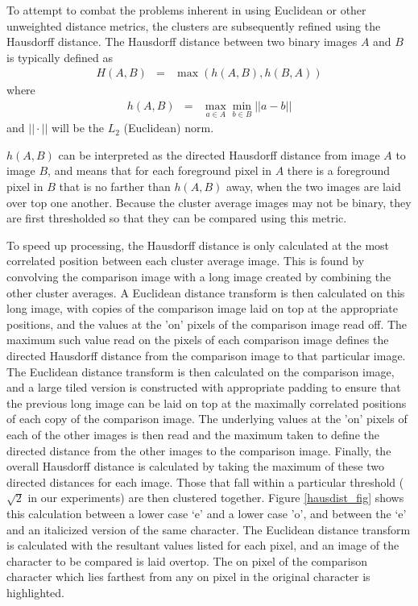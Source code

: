 \documentclass[times, 10pt,twocolumn]{article}
\begin{document}
To attempt to combat the problems inherent in using Euclidean or other
unweighted distance metrics, the clusters are subsequently refined using the
Hausdorff distance\cite{rucklidge1996}.  The Hausdorff distance between two 
binary images $A$ and $B$ is typically defined as
\begin{eqnarray}
H(A,B) & = & \max(h(A,B), h(B,A))
\end{eqnarray}
where
\begin{eqnarray}
h(A,B) & = & \max_{a \in A} \min_{b \in B} || a - b ||
\end{eqnarray}
and $|| \cdot ||$ will be the $L_2$ (Euclidean) norm.

$h(A,B)$ can be interpreted as the directed Hausdorff distance from image $A$ to
image $B$, and means that for each foreground pixel in $A$ there is a foreground
pixel in $B$ that is no farther than $h(A,B)$ away, when the two images are 
laid over top one another.  Because the cluster average images may not be
binary, they are first thresholded so that they can be compared using this
metric.

To speed up processing, the Hausdorff distance is only calculated at the most
correlated position between each cluster average image.  This is found by
convolving the comparison image with a long image created by combining the
other cluster averages.  A Euclidean distance transform is then calculated on
this long image, with copies of the comparison image laid on top at the
appropriate positions, and the values at the 'on' pixels of the comparison 
image read off.  The maximum such value read on the pixels of each
comparison image defines the directed Hausdorff distance from the comparison 
image to that particular image.  The Euclidean distance transform is then
calculated on the comparison image, and a large tiled version is constructed
with appropriate padding to ensure that the previous long image can be laid on
top at the maximally correlated positions of each copy of the comparison image.
The underlying values at the 'on' pixels of each of the other images is then
read and the maximum taken to define the directed distance from the other
images to the comparison image.  Finally, the overall Hausdorff distance is
calculated by taking the maximum of these two directed distances for each
image.  Those that fall within a particular threshold ($\sqrt 2$ in our
experiments) are then clustered together.  Figure \ref{hausdist_fig}
shows this calculation between a lower case `e' and a lower case 'o', and
between the `e' and an italicized version of the same character.  The Euclidean
distance transform is calculated with the resultant values listed for each
pixel, and an image of the character to be compared is laid overtop.  The on 
pixel of the comparison character which lies farthest from any on pixel in the
original character is highlighted. 
\end{document}
